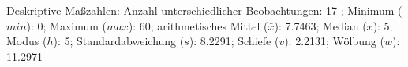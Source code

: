 				\label{tableValues:pocc65d}
				\vspace*{-\baselineskip}
                    \begin{noten}
                	    \note{} Deskriptive Maßzahlen:
                	    Anzahl unterschiedlicher Beobachtungen: 17%
                	    ; 
                	      Minimum ($min$): 0; 
                	      Maximum ($max$): 60; 
                	      arithmetisches Mittel ($\bar{x}$): \num[round-mode=places,round-precision=2]{7.7463}; 
                	      Median ($\tilde{x}$): 5; 
                	      Modus ($h$): 5; 
                	      Standardabweichung ($s$): \num[round-mode=places,round-precision=2]{8.2291}; 
                	      Schiefe ($v$): \num[round-mode=places,round-precision=2]{2.2131}; 
                	      Wölbung ($w$): \num[round-mode=places,round-precision=2]{11.2971}
                     \end{noten}

